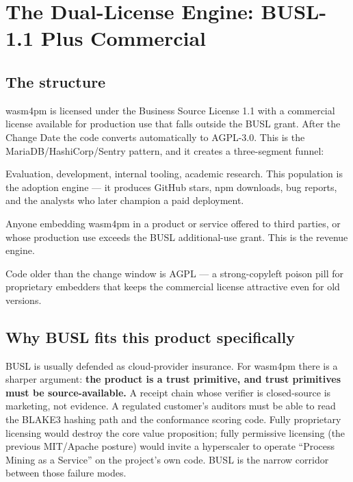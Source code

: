\chapter{The Dual-License Engine: BUSL-1.1 Plus Commercial}
\label{ch:licensing}

\section{The structure}

wasm4pm is licensed under the Business Source License 1.1 with a commercial
license available for production use that falls outside the BUSL grant. After
the Change Date the code converts automatically to AGPL-3.0. This is the
MariaDB/HashiCorp/Sentry pattern, and it creates a three-segment funnel:

\begin{description}[leftmargin=2em]
  \item[Free tier (BUSL-compliant use).] Evaluation, development, internal
    tooling, academic research. This population is the adoption engine ---
    it produces GitHub stars, npm downloads, bug reports, and the analysts
    who later champion a paid deployment.
  \item[Commercial tier.] Anyone embedding wasm4pm in a product or service
    offered to third parties, or whose production use exceeds the BUSL
    additional-use grant. This is the revenue engine.
  \item[Post-Change-Date tier.] Code older than the change window is AGPL ---
    a strong-copyleft poison pill for proprietary embedders that keeps the
    commercial license attractive even for old versions.
\end{description}

\section{Why BUSL fits this product specifically}

BUSL is usually defended as cloud-provider insurance. For wasm4pm there is a
sharper argument: \textbf{the product is a trust primitive, and trust
primitives must be source-available.} A receipt chain whose verifier is
closed-source is marketing, not evidence. A regulated customer's auditors
must be able to read the BLAKE3 hashing path and the conformance scoring
code. Fully proprietary licensing would destroy the core value proposition;
fully permissive licensing (the previous MIT/Apache posture) would invite a
hyperscaler to operate ``Process Mining as a Service'' on the project's own
code. BUSL is the narrow corridor between those failure modes.


